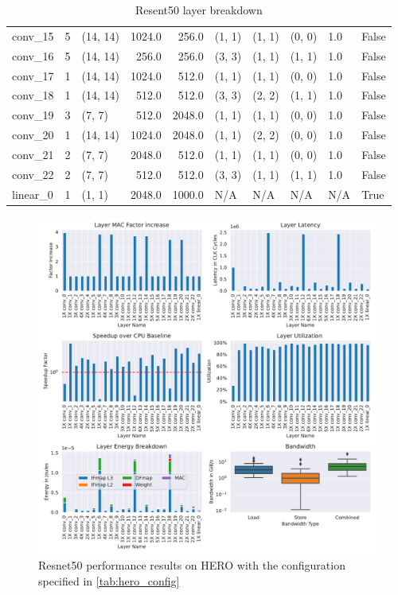 \begin{center}
\begin{table}[]
\begin{tabular}{lrlrrlllll}
        conv\_15  & 5 &    (14, 14) &  1024.0 &   256.0 &  (1, 1) &  (1, 1) &  (0, 0) &    1.0 &  False \\
        conv\_16  & 5 &    (14, 14) &   256.0 &   256.0 &  (3, 3) &  (1, 1) &  (1, 1) &    1.0 &  False \\
        conv\_17  & 1 &    (14, 14) &  1024.0 &   512.0 &  (1, 1) &  (1, 1) &  (0, 0) &    1.0 &  False \\
        conv\_18  & 1 &    (14, 14) &   512.0 &   512.0 &  (3, 3) &  (2, 2) &  (1, 1) &    1.0 &  False \\
        conv\_19  & 3 &      (7, 7) &   512.0 &  2048.0 &  (1, 1) &  (1, 1) &  (0, 0) &    1.0 &  False \\
        conv\_20  & 1 &    (14, 14) &  1024.0 &  2048.0 &  (1, 1) &  (2, 2) &  (0, 0) &    1.0 &  False \\
        conv\_21  & 2 &      (7, 7) &  2048.0 &   512.0 &  (1, 1) &  (1, 1) &  (0, 0) &    1.0 &  False \\
        conv\_22  & 2 &      (7, 7) &   512.0 &   512.0 &  (3, 3) &  (1, 1) &  (1, 1) &    1.0 &  False \\
        linear\_0 & 1 &      (1, 1) &  2048.0 &  1000.0 &     N/A &     N/A &     N/A &    N/A &   True \\
        \bottomrule
        \end{tabular}
        \caption{Resent50 layer breakdown}
        \label{tab:resnet50_layer_breakdown}
\end{table}
\end{center}

\begin{figure}[ht]
    \centering
    \includegraphics[scale=0.6]{Plots/networks/resnet50.pdf}
    \caption{Resnet50 performance results on HERO with the configuration specified in \autoref{tab:hero_config}}
    \label{fig:resnet50_metrics}
\end{figure}

